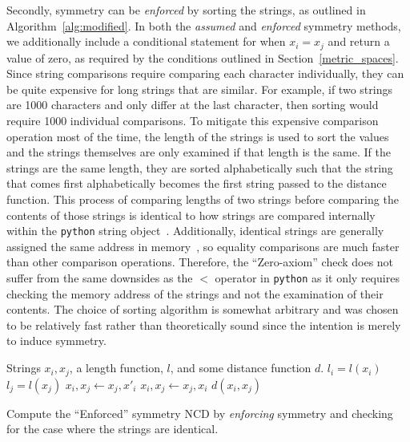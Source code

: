 \documentclass[preprint,12pt]{article}
\begin{document}
Secondly, symmetry can be \textit{enforced} by sorting the strings, as outlined in Algorithm~\ref{alg:modified}.
In both the \textit{assumed} and \textit{enforced} symmetry methods, we additionally include a conditional statement for when $x_i = x_j$ and return a value of zero, as required by the conditions outlined in Section~\ref{metric_spaces}.
Since string comparisons require comparing each character individually, they can be quite expensive for long strings that are similar.
For example, if two strings are 1000 characters and only differ at the last character, then sorting would require 1000 individual comparisons.
To mitigate this expensive comparison operation most of the time, the length of the strings is used to sort the values and the strings themselves are only examined if that length is the same. 
If the strings are the same length, they are sorted alphabetically such that the string that comes first alphabetically becomes the first string passed to the distance function.
This process of comparing lengths of two strings before comparing the contents of those strings is identical to how strings are compared internally within the \texttt{python} string object~\cite{}. 
Additionally, identical strings are generally assigned the same address in memory~\cite{}, so equality comparisons are much faster than other comparison operations. 
Therefore, the ``Zero-axiom'' check does not suffer from the same downsides as the $<$ operator in \texttt{python} as it only requires checking the memory address of the strings and not the examination of their contents.
The choice of sorting algorithm is somewhat arbitrary and was chosen to be relatively fast rather than theoretically sound since the intention is merely to induce symmetry. 

\begin{algorithm}
    \begin{algorithmic}
        \Require Strings $x_i, x_j$, a length function, $l$, and some distance function $d$.
         
            \State {}
        \Else  {}
            \State $l_i = l(x_i)$
            \State $l_j = l(x_j)$
                 \State $x_i, x_j \gets x_j, x'_i$ 
                 
                     \State $x_i, x_j \gets x_j, x_i$ 
                \EndIf
            \EndIf
            \State \Return $d(x_i, x_j)$
        \EndIf
    \end{algorithmic}
    \caption{Compute the ``Enforced'' symmetry NCD by \textit{enforcing} symmetry and checking for the case where the strings are identical.}
    \label{alg:modified}
\end{algorithm}
\end{document}
